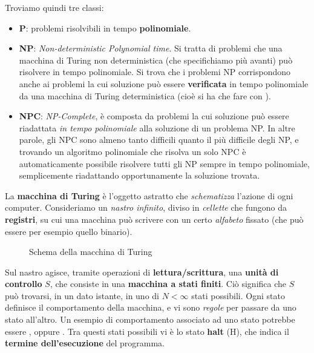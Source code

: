 \documentclass[../../InformazioneQuantistica.tex]{subfiles}
\begin{document}
Troviamo quindi tre classi:
\begin{itemize}
\item \textbf{P}: problemi risolvibili in tempo \textbf{polinomiale}.
\item \textbf{NP}: \textit{Non-deterministic Polynomial time}. Si tratta di problemi che una macchina di Turing non deterministica (che specifichiamo più avanti) può risolvere in tempo polinomiale. Si trova che i problemi NP corrispondono anche ai problemi la cui soluzione può essere \textbf{verificata} in tempo polinomiale da una macchina di Turing deterministica (cioè si ha che fare con ).
\item \textbf{NPC}: \textit{NP-Complete}, è composta da problemi la cui soluzione può essere riadattata \textit{in tempo polinomiale} alla soluzione di un problema NP. In altre parole, gli NPC sono almeno tanto difficili quanto il più difficile degli NP, e trovando un algoritmo polinomiale che risolva un solo NPC è automaticamente possibile risolvere tutti gli NP sempre in tempo polinomiale, semplicemente riadattando opportunamente la soluzione trovata.
\end{itemize}

La \textbf{macchina di Turing} è l'oggetto astratto che \textit{schematizza} l'azione di ogni computer. Consideriamo un \textit{nastro infinito}, diviso in \textit{cellette} che fungono da \textbf{registri}, su cui una macchina può scrivere con un certo \textit{alfabeto} fissato (che può essere per esempio quello binario).

\begin{figure}[H]
\centering

\caption{Schema della macchina di Turing\label{fig:turing}}
\end{figure}

Sul nastro agisce, tramite operazioni di \textbf{lettura/scrittura}, una \textbf{unità di controllo} $S$, che consiste in una \textbf{macchina a stati finiti}. Ciò significa che $S$ può trovarsi, in un dato istante, in uno di $N<\infty$ stati possibili. Ogni stato definisce il comportamento della macchina, e vi sono \textit{regole} per passare da uno stato all'altro. Un esempio di comportamento associato ad uno stato potrebbe essere , oppure . Tra questi stati possibili vi è lo stato \textbf{halt} (H), che indica il \textbf{termine dell'esecuzione} del programma.\\
\end{document}
